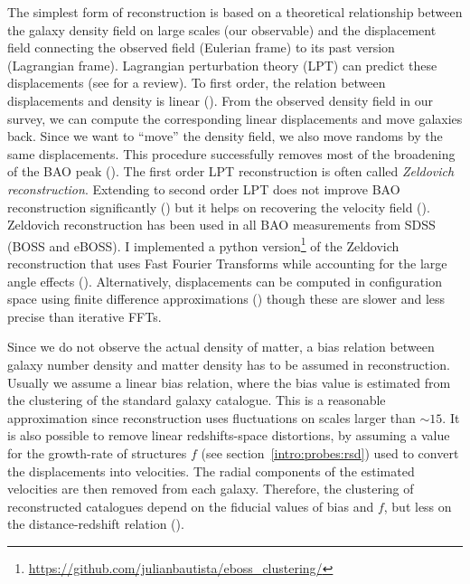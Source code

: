 The simplest form of reconstruction is based on a theoretical relationship between 
the galaxy density field on large scales (our observable) 
and the displacement field connecting the observed field (Eulerian frame) 
to its past version (Lagrangian frame). 
Lagrangian perturbation theory (LPT) can predict these displacements 
(see \cite{bernardeauLargeScaleStructureUniverse2002} for a review). 
To first order, the relation between displacements and density is linear 
(\cite{zeldovichGravitationalInstabilityApproximate1970}). 
From the observed density field in our survey, we can compute the corresponding linear displacements
and move galaxies back. 
Since we want to ``move'' the density field, we also move randoms by the same displacements. 
This procedure successfully removes most of the broadening of the BAO peak
(\cite{nusserTracingLargeScaleFluctuations1992, eisensteinImprovingCosmologicalDistance2007}).
The first order LPT reconstruction is often called \emph{Zeldovich reconstruction}. 
Extending to second order LPT does not improve BAO reconstruction significantly 
(\cite{seoHighprecisionPredictionsAcoustic2010}) but it helps on recovering the 
velocity field (\cite{kitauraEstimatingCosmicVelocity2012}).
Zeldovich reconstruction has been used in all BAO measurements from SDSS (BOSS and eBOSS).
I implemented a python version\footnote{\url{https://github.com/julianbautista/eboss_clustering/}} of 
the Zeldovich reconstruction that uses Fast Fourier Transforms while accounting for the 
large angle effects 
(\cite{burdenEfficientReconstructionLinear2014, burdenReconstructionFourierSpace2015}). 
Alternatively, displacements can be computed 
in configuration space using finite difference approximations (\cite{padmanabhanCentDistance352012})
though these are slower and less precise than iterative FFTs. 

Since we do not observe the actual density of matter, a bias relation between galaxy number density 
and matter density has to be assumed in reconstruction. 
Usually we assume a linear bias relation, where the 
bias value is estimated from the clustering of the standard galaxy catalogue. 
This is a reasonable approximation 
since reconstruction uses fluctuations on scales larger than $\sim 15$\hmpc. 
It is also possible to remove linear redshifts-space distortions, 
by assuming a value for the growth-rate of structures $f$
(see section~\ref{intro:probes:rsd}) used to convert the displacements into velocities.
The radial components of the estimated velocities are then removed from each galaxy.  
Therefore, the clustering of reconstructed catalogues depend on the fiducial values of bias and $f$, 
but less on the distance-redshift relation (\cite{carterImpactFiducialCosmology2020}). 


